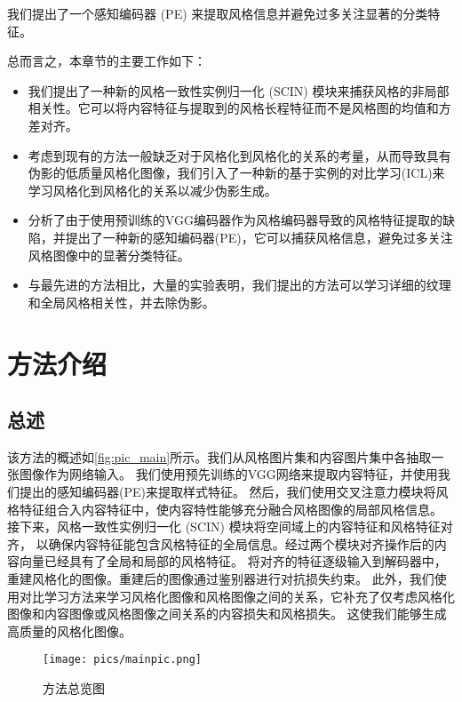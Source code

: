 我们提出了一个感知编码器 (PE) 来提取风格信息并避免过多关注显著的分类特征。
\par 总而言之，本章节的主要工作如下： 
\begin{itemize}
    \item 我们提出了一种新的风格一致性实例归一化 (SCIN) 模块来捕获风格的非局部相关性。它可以将内容特征与提取到的风格长程特征而不是风格图的均值和方差对齐。
    \item 考虑到现有的方法一般缺乏对于风格化到风格化的关系的考量，从而导致具有伪影的低质量风格化图像，我们引入了一种新的基于实例的对比学习(ICL)来学习风格化到风格化的关系以减少伪影生成。
    \item 分析了由于使用预训练的VGG编码器作为风格编码器导致的风格特征提取的缺陷，并提出了一种新的感知编码器(PE)，它可以捕获风格信息，避免过多关注风格图像中的显著分类特征。
    \item 与最先进的方法相比，大量的实验表明，我们提出的方法可以学习详细的纹理和全局风格相关性，并去除伪影。
\end{itemize}

\section{方法介绍}
\subsection{总述}
\par 该方法的概述如\autoref{fig:pic_main}所示。我们从风格图片集和内容图片集中各抽取一张图像作为网络输入。
我们使用预先训练的VGG网络来提取内容特征，并使用我们提出的感知编码器(PE)来提取样式特征。
然后，我们使用交叉注意力模块将风格特征组合入内容特征中，使内容特性能够充分融合风格图像的局部风格信息。
接下来，风格一致性实例归一化 (SCIN) 模块将空间域上的内容特征和风格特征对齐，
以确保内容特征能包含风格特征的全局信息。经过两个模块对齐操作后的内容向量已经具有了全局和局部的风格特征。
将对齐的特征逐级输入到解码器中，重建风格化的图像。重建后的图像通过鉴别器进行对抗损失约束。
此外，我们使用对比学习方法来学习风格化图像和风格图像之间的关系，它补充了仅考虑风格化图像和内容图像或风格图像之间关系的内容损失和风格损失。
这使我们能够生成高质量的风格化图像。
\begin{figure}[htbp]
    \centering
    \texttt{[image: pics/mainpic.png]}
    \caption{\label{fig:pic_main}方法总览图}
\end{figure}
